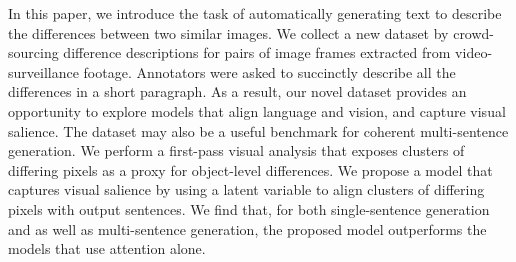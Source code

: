 In this paper, we introduce the task of automatically generating text to describe the differences between two similar images. We collect a new dataset by crowd-sourcing difference descriptions for pairs of image frames extracted from video-surveillance footage. Annotators were asked to succinctly describe all the differences in a short paragraph. As a result, our novel dataset provides an opportunity to explore models that align language and vision, and capture visual salience. The dataset may also be a useful benchmark for coherent multi-sentence generation. We perform a first-pass visual analysis that exposes clusters of differing pixels as a proxy for object-level differences. We propose a model that captures visual salience by using a latent variable to align clusters of differing pixels with output sentences. We find that, for both single-sentence generation and as well as multi-sentence generation, the proposed model outperforms the models that use attention alone.
